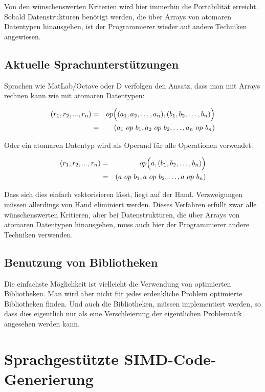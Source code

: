 \documentclass[a4paper,10pt]{article}
\begin{document}
Von den wünschenswerten Kriterien wird hier immerhin die Portabilität erreicht. Sobald
Datenstrukturen benötigt werden, die über Arrays von atomaren Datentypen hinausgehen, ist der
Programmierer wieder auf andere Techniken angewiesen.

\subsection{Aktuelle Sprachunterstützungen}

Sprachen wie MatLab/Octave oder D verfolgen den Ansatz, dass man mit Arrays rechnen kann wie mit
atomaren Datentypen:

\begin{eqnarray*}
    (r_1, r_2, ..., r_n)    & = & op\Bigl( (a_1, a_2, \dots, a_n), (b_1, b_2, \dots, b_n) \Bigr)\\ 
                            & = & (a_1 \ op \ b_1, a_2 \ op \ b_2, \dots, a_n \ op \ b_n)
\end{eqnarray*}

Oder ein atomaren Datentyp wird als Operand für alle Operationen verwendet:

\begin{eqnarray*}
    (r_1, r_2, ..., r_n)    & = & op\Bigl( a, (b_1, b_2, \dots, b_n) \Bigr)\\ 
                            & = & (a \ op \ b_1, a \ op \ b_2, \dots, a \ op \ b_n)
\end{eqnarray*}

Dass sich dies einfach vektorisieren lässt, liegt auf der Hand. Verzweigungen müssen allerdings von
Hand eliminiert werden. Dieses Verfahren erfüllt zwar alle wünschenswerten Kritieren, aber bei
Datenstrukturen, die über Arrays von atomaren Datentypen hinausgehen, muss auch hier der
Programmierer andere Techniken verwenden.

\subsection{Benutzung von Bibliotheken}

Die einfachste Möglichkeit ist vielleicht die Verwendung von optimierten Bibliotheken. Man wird aber
nicht für jedes erdenkliche Problem optimierte Bibliotheken finden. Und auch die Bibliotheken, müssen
implementiert werden, so dass dies eigentlich nur als eine Verschleierung der eigentlichen Problematik
angesehen werden kann.

\section{Sprachgestützte SIMD-Code-Generierung}
\end{document}
